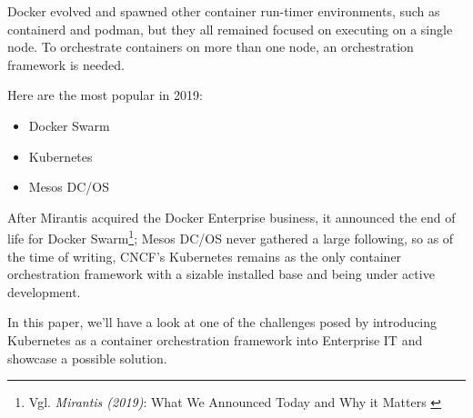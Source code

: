 Docker evolved and spawned other container run-timer environments, such as containerd and podman, but they all remained focused on executing on a single node. To orchestrate containers on more than one node, an orchestration framework is needed. 

Here are the most popular in 2019:
\begin{itemize}
\item Docker Swarm
\item Kubernetes
\item Mesos DC/OS
\end{itemize}

After Mirantis acquired the Docker Enterprise business, it announced the end of life for Docker Swarm\footnote{Vgl. \textit{Mirantis (2019)}: What We Announced Today and Why it Matters \cite{mirantisDocker}}; Mesos DC/OS never gathered a large following, so as of the time of writing, CNCF's Kubernetes remains as the only container orchestration framework with a sizable installed base and being under active development.

In this paper, we'll have a look at one of the challenges posed by introducing Kubernetes as a container orchestration framework into Enterprise IT and showcase a possible solution.
